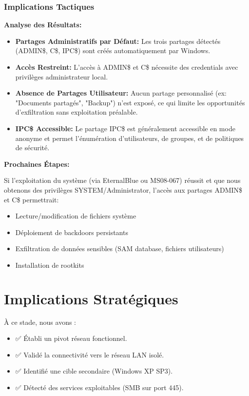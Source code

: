 \documentclass[12pt,a4paper,openany]{report}
\begin{document}
	\subsubsection{Implications Tactiques}
	
	\textbf{Analyse des Résultats:}
	\begin{itemize}
		\item \textbf{Partages Administratifs par Défaut:} Les trois partages 
		détectés (ADMIN\$, C\$, IPC\$) sont créés automatiquement par Windows.
		
		\item \textbf{Accès Restreint:} L'accès à ADMIN\$ et C\$ nécessite des 
		credentials avec privilèges administrateur local.
		
		\item \textbf{Absence de Partages Utilisateur:} Aucun partage personnalisé 
		(ex: "Documents partagés", "Backup") n'est exposé, ce qui limite 
		les opportunités d'exfiltration sans exploitation préalable.
		
		\item \textbf{IPC\$ Accessible:} Le partage IPC\$ est généralement accessible 
		en mode anonyme et permet l'énumération d'utilisateurs, de groupes, 
		et de politiques de sécurité.
	\end{itemize}
	
	\textbf{Prochaines Étapes:}
	
	Si l'exploitation du système (via EternalBlue ou MS08-067) réussit et que 
	nous obtenons des privilèges SYSTEM/Administrator, l'accès aux partages 
	ADMIN\$ et C\$ permettrait:
	\begin{itemize}
		\item Lecture/modification de fichiers système
		\item Déploiement de backdoors persistants
		\item Exfiltration de données sensibles (SAM database, fichiers utilisateurs)
		\item Installation de rootkits
	\end{itemize}
	
	
	\section{Implications Stratégiques}
	
	À ce stade, nous avons :
	\begin{itemize}
		\item ✅ Établi un pivot réseau fonctionnel.
		\item ✅ Validé la connectivité vers le réseau LAN isolé.
		\item ✅ Identifié une cible secondaire (Windows XP SP3).
		\item ✅ Détecté des services exploitables (SMB sur port 445).
	\end{itemize}
	
\end{document}
